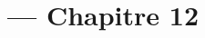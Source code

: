 
\title{\TSwiftTitle{} --- Chapitre 12}

\newcommand{\TSwiftRoot}[0]{../..} %



\maketitle

\tableofcontents




